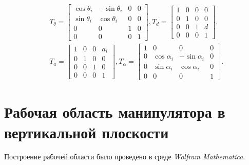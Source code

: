 \begin{align*}
    & T_\theta = \begin{bmatrix}
        \cos \theta_i & -\sin \theta_i & 0 & 0 \\
        \sin \theta_i & \cos \theta_i & 0 & 0 \\
        0 & 0 & 1 & 0 \\
        0 & 0 & 0 & 1
    \end{bmatrix}, 
    T_d = \begin{bmatrix}
        1 & 0 & 0 & 0 \\
        0 & 1 & 0 & 0 \\
        0 & 0 & 1 & d \\
        0 & 0 & 0 & 1
    \end{bmatrix}, \\
    & T_a = \begin{bmatrix}
        1 & 0 & 0 & a_{i} \\
        0 & 1 & 0 & 0 \\
        0 & 0 & 1 & 0 \\
        0 & 0 & 0 & 1
    \end{bmatrix},
    T_\alpha = \begin{bmatrix}
        1 & 0 & 0 & 0 \\
        0 & \cos \alpha_{i} & -\sin \alpha_{i} & 0 \\
        0 & \sin \alpha_{i} & \cos \alpha_{i} & 0 \\
        0 & 0 & 0 & 1
    \end{bmatrix} .
\end{align*}

\section{Рабочая область манипулятора в вертикальной плоскости}
Построение рабочей области было проведено в среде \textit{Wolfram Mathematica}. 

\begin{code}
    
\end{code}